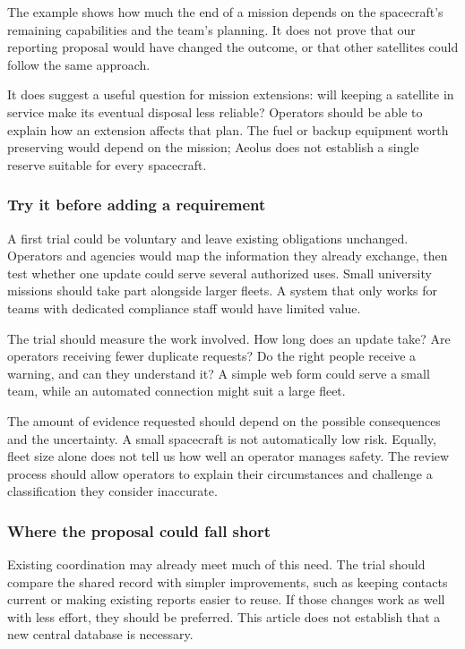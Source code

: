 \documentclass[11pt,letterpaper]{article}
\begin{document}
The example shows how much the end of a mission depends on the
spacecraft's remaining capabilities and the team's planning. It does not
prove that our reporting proposal would have changed the outcome, or
that other satellites could follow the same approach.

It does suggest a useful question for mission extensions: will keeping a
satellite in service make its eventual disposal less reliable? Operators
should be able to explain how an extension affects that plan. The fuel
or backup equipment worth preserving would depend on the mission; Aeolus
does not establish a single reserve suitable for every spacecraft.

\hypertarget{try-it-before-adding-a-requirement}{%
\subsubsection{Try it before adding a
requirement}\label{try-it-before-adding-a-requirement}}

A first trial could be voluntary and leave existing obligations
unchanged. Operators and agencies would map the information they already
exchange, then test whether one update could serve several authorized
uses. Small university missions should take part alongside larger
fleets. A system that only works for teams with dedicated compliance
staff would have limited value.

The trial should measure the work involved. How long does an update
take? Are operators receiving fewer duplicate requests? Do the right
people receive a warning, and can they understand it? A simple web form
could serve a small team, while an automated connection might suit a
large fleet.

The amount of evidence requested should depend on the possible
consequences and the uncertainty. A small spacecraft is not
automatically low risk. Equally, fleet size alone does not tell us how
well an operator manages safety. The review process should allow
operators to explain their circumstances and challenge a classification
they consider inaccurate.

\hypertarget{where-the-proposal-could-fall-short}{%
\subsubsection{Where the proposal could fall
short}\label{where-the-proposal-could-fall-short}}

Existing coordination may already meet much of this need. The trial
should compare the shared record with simpler improvements, such as
keeping contacts current or making existing reports easier to reuse. If
those changes work as well with less effort, they should be preferred.
This article does not establish that a new central database is
necessary.
\end{document}
